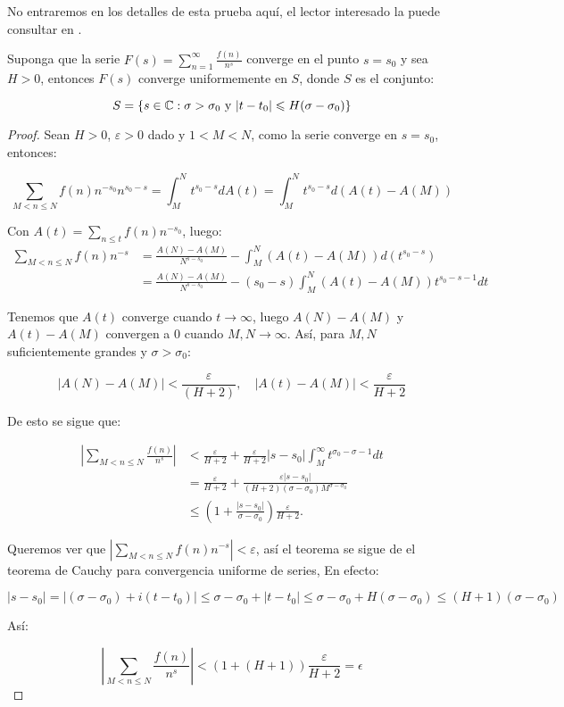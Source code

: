 No entraremos en los detalles de esta prueba aquí, el lector interesado la puede  consultar en \cite{stein2010complex}.

\begin{theorem}
Suponga que la serie $F(s)=\displaystyle\sum_{n=1}^{\infty} \frac{f(n)}{n^s}$ converge en el punto $s=s_0$ y sea $H>0$, entonces $F(s)$ converge uniformemente en $S$, donde $S$ es el conjunto:

$$S=\{s\in \mathbb{C} : \sigma>\sigma_0 \text{ y } |t-t_0|\leqslant H(\sigma-\sigma_0)\}$$
\end{theorem}
\begin{center}

\end{center}

\begin{proof}
Sean $H>0$, $\varepsilon>0$ dado y $1<M<N$, como la serie converge en $s=s_0$, entonces:

$$\sum_{M<n \leq N} f(n) n^{-s_0} n^{s_0-s}=\int_M^N t^{s_0-s} d A(t)=\int_M^N t^{s_0-s} d(A(t)-A(M))$$

Con $A(t)=\displaystyle\sum_{n \leq t} f(n) n^{-s_0}$, luego:
$$
\begin{aligned}
\sum_{M<n \leq N} f(n) n^{-s} & =\frac{A(N)-A(M)}{N^{s-s_0}}- \int_M^N(A(t)-A(M)) d(t^{s_0-s})\\
&=\frac{A(N)-A(M)}{N^{s-s_0}}-(s_0-s)\int_M^N(A(t)-A(M))t^{s_0-s-1}dt
\end{aligned}
$$

Tenemos que $A(t)$ converge cuando $t\to\infty$, luego $A(N)-A(M)$ y $A(t)-A(M)$ convergen a 0 cuando $M,N\to \infty$. Así, para $M, N$ suficientemente grandes y $\sigma>\sigma_0$:

$$|A(N)-A(M)|<\frac{\varepsilon}{(H+2)}, \quad|A(t)-A(M)|<\frac{\varepsilon}{H+2}$$

De esto se sigue que:

$$\begin{aligned}
\left|\sum_{M<n \leq N} \frac{f(n)}{n^s}\right|&<\frac{\varepsilon}{H+2}+\frac{\varepsilon}{H+2}\left|s-s_0\right| \int_M^{\infty} t^{\sigma_0-\sigma-1} d t\\
&=\frac{\varepsilon}{H+2}+\frac{\varepsilon\left|s-s_0\right|}{(H+2)\left(\sigma-\sigma_0\right) M^{\sigma-\sigma_0}}\\
&\leq\left(1+\frac{\left|s-s_0\right|}{\sigma-\sigma_0}\right) \frac{\varepsilon}{H+2} .
\end{aligned}$$

Queremos ver que $\left|\displaystyle\sum_{M<n \leq N} f(n) n^{-s}\right|<\varepsilon$, así el teorema se sigue de el teorema de Cauchy para convergencia uniforme de series, En efecto:

$$\left|s-s_0\right|=\left|\left(\sigma-\sigma_0\right)+i\left(t-t_0\right)\right| \leq \sigma-\sigma_0+\left|t-t_0\right| \leq\sigma-\sigma_0+H(\sigma-\sigma_0)\leq(H+1)\left(\sigma-\sigma_0\right)$$

Así:

$$\left|\sum_{M<n \leq N} \frac{f(n)}{n^s}\right|<(1+(H+1))\frac{\varepsilon}{H+2}=\epsilon$$
\end{proof}


